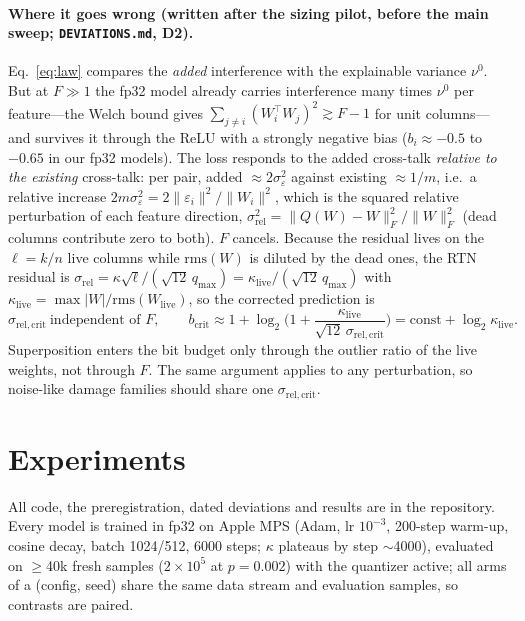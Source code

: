 \documentclass{article}
\begin{document}
\paragraph{Where it goes wrong (written after the sizing pilot, before the main sweep; \texttt{DEVIATIONS.md}, D2).}
Eq.~\eqref{eq:law} compares the \emph{added} interference with the explainable variance $\nu^0$. But at $F\gg1$ the
fp32 model already carries interference many times $\nu^0$ per feature---the Welch bound gives
$\sum_{j\ne i}(W_i^{\top}W_j)^2\gtrsim F-1$ for unit columns---and survives it through the ReLU with a strongly
negative bias ($b_i\approx-0.5$ to $-0.65$ in our fp32 models). The loss responds to the added cross-talk
\emph{relative to the existing} cross-talk: per pair, added $\approx2\sigma_\varepsilon^2$ against existing
$\approx1/m$, i.e.\ a relative increase $2m\sigma_\varepsilon^2 = 2\lVert\varepsilon_i\rVert^2/\lVert W_i\rVert^2$,
which is the squared relative perturbation of each feature direction, $\sigma_{\mathrm{rel}}^2 =
\lVert Q(W)-W\rVert_F^2/\lVert W\rVert_F^2$ (dead columns contribute zero to both). $F$ cancels. Because the residual
lives on the $\ell=k/n$ live columns while $\mathrm{rms}(W)$ is diluted by the dead ones, the RTN residual is
$\sigma_{\mathrm{rel}} = \kappa\sqrt{\ell}/(\sqrt{12}\,q_{\max}) = \kappa_{\mathrm{live}}/(\sqrt{12}\,q_{\max})$
with $\kappa_{\mathrm{live}} = \max|W|/\mathrm{rms}(W_{\mathrm{live}})$, so the corrected prediction is
\begin{equation}
\sigma_{\mathrm{rel,crit}}\ \text{independent of }F,\qquad
b_{\mathrm{crit}} \approx 1+\log_2\!\Big(1+\frac{\kappa_{\mathrm{live}}}{\sqrt{12}\,\sigma_{\mathrm{rel,crit}}}\Big)
= \mathrm{const}+\log_2\kappa_{\mathrm{live}} .
\label{eq:corrected}
\end{equation}
Superposition enters the bit budget only through the outlier ratio of the live weights, not through $F$. The same
argument applies to any perturbation, so noise-like damage families should share one $\sigma_{\mathrm{rel,crit}}$.


\section{Experiments}

All code, the preregistration, dated deviations and results are in the repository. Every model is trained in fp32
on Apple MPS (Adam, lr $10^{-3}$, 200-step warm-up, cosine decay, batch 1024/512, 6000 steps; $\kappa$ plateaus by
step $\sim$4000), evaluated on $\ge$40k fresh samples ($2\times10^5$ at $p=0.002$) with the quantizer active; all arms of
a (config, seed) share the same data stream and evaluation samples, so contrasts are paired.
\end{document}
